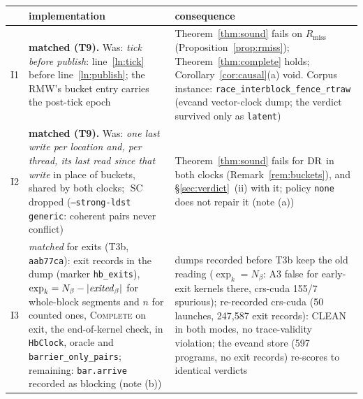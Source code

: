 \documentclass[11pt]{article}
\theoremstyle{remark}
\DeclareMathOperator{\SC}{SC}
\newcommand{\cls}[1]{\texttt{#1}}\newcommand{\M}{\mathsf{M}}
\begin{document}
\begin{table}[!htbp]\centering\small
\begin{tabular}{@{}lp{6.4cm}p{6.2cm}@{}}
\toprule
& implementation & consequence \\
\midrule
I1 & \textbf{matched (T9).} Was: \emph{tick before publish}: line~\ref{ln:tick} before line~\ref{ln:publish}; the RMW's bucket entry carries the post-tick epoch & Theorem~\ref{thm:sound} fails on $R_{\mathrm{miss}}$ (Proposition~\ref{prop:rmiss}); Theorem~\ref{thm:complete} holds; Corollary~\ref{cor:causal}(a) void. Corpus instance: \texttt{race\_interblock\_fence\_rtraw} (evcand vector-clock dump; the verdict survived only as \cls{latent}) \\
I2 & \textbf{matched (T9).} Was: \emph{one last write per location and, per thread, its last read since that write} in place of buckets, shared by both clocks; $\SC$ dropped (\texttt{--strong-ldst generic}: coherent pairs never conflict) & Theorem~\ref{thm:sound} fails for $\operatorname{DR}$ in both clocks (Remark~\ref{rem:buckets}), and \S\ref{sec:verdict}~(ii) with it; policy \texttt{none} does not repair it (note (a)) \\
I3 & \emph{matched} for exits (T3b, \texttt{aab77ca}): exit records in the dump (marker \texttt{hb\_exits}), $\exp_k=N_\beta-|\mathit{exited}_\beta|$ for whole-block segments and $n$ for counted ones, \textsc{Complete} on exit, the end-of-kernel check, in \texttt{HbClock}, oracle and \texttt{barrier\_only\_pairs}; remaining: \texttt{bar.arrive} recorded as blocking (note (b)) & dumps recorded before T3b keep the old reading ($\exp_k=N_\beta$: A3 false for early-exit kernels there, crs-cuda 155/7 spurious); re-recorded crs-cuda (50 launches, 247,587 exit records): CLEAN in both modes, no trace-validity violation; the evcand store (597 programs, no exit records) re-scores to identical verdicts \\

\end{tabular}
\end{table}
\end{document}
